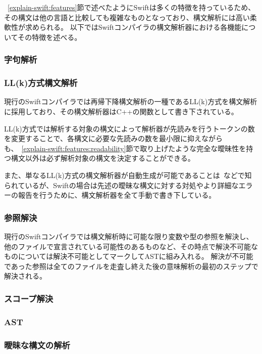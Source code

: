 ~\ref{explain-swift:features}節で述べたようにSwiftは多くの特徴を持っているため、その構文は他の言語と比較しても複雑なものとなっており、構文解析には高い柔軟性が求められる。
以下ではSwiftコンパイラの構文解析器における各機能についてその特徴を述べる。

\subsubsection{字句解析}

\subsubsection{LL(k)方式構文解析}

現行のSwiftコンパイラでは再帰下降構文解析の一種であるLL(k)方式を構文解析に採用しており、その構文解析器はC++の関数として書き下されている。

LL(k)方式では解析する対象の構文によって解析器が先読みを行うトークンの数を変更することで、各構文に必要な先読みの数を最小限に抑えながらも、~\ref{explain-swift:features:readability}節で取り上げたような完全な曖昧性を持つ構文以外は必ず解析対象の構文を決定することができる。

また、単なるLL(k)方式の構文解析器が自動生成が可能であることは~\cite{antlr}などで知られているが、Swiftの場合は先述の曖昧な構文に対する対処やより詳細なエラーの報告を行うために、構文解析器を全て手動で書き下している。

\subsubsection{参照解決}

現行のSwiftコンパイラでは構文解析時に可能な限り変数や型の参照を解決し、他のファイルで宣言されている可能性のあるものなど、その時点で解決不可能なものについては解決不可能としてマークしてASTに組み入れる。
解決が不可能であった参照は全てのファイルを走査し終えた後の意味解析の最初のステップで解決される。

\subsubsection{スコープ解決}

\subsubsection{AST}

\subsubsection{曖昧な構文の解析}

